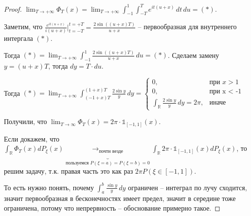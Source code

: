 \begin{proof}






    $\lim_{T \to +\infty} \Phi_T (x) = \lim_{T \to +\infty} \int_{-1}^1 \int_{-T}^T e^{it(u + x)} \, dt \, du = (*)$.

    Заметим, что $\frac{e^{it(u + x)}}{i(u + x)} \bigg |_{t = -T}^{t = +T} = \frac{2\sin ((u + x)T)}{u + x}$ -- первообразная для внутреннего интергала $(*)$.

    Тогда $(*) = \lim_{T \to +\infty} \int_{-1}^1 \frac{2\sin ((u + x)T)}{u + x} \, du = (*)$. Сделаем замену $y = (u + x)T$, тогда $dy = T \cdot du$.

    Тогда $(*) = \lim_{T \to +\infty} \int_{(-1 + x)T}^{(1 + x)T} \frac{2 \sin y}{y} \, dy = \begin{cases}
        0, & \text{при $x > 1$} \\
        0, & \text{при x < -1} \\
        \int_{\mathbb{R}} \frac{2 \sin y}{y} \, dy = 2\pi, & \text{иначе}
    \end{cases}$

    Получили, что $\lim_{T \to \infty} \Phi_T(x) = 2 \pi \cdot \mathds{1}_{[-1, 1]} (x)$.

    Если докажем, что $\int_{\mathbb{R}} \Phi_{T} (x) d P_{\xi}(x) \underbrace{\to_{\text{почти везде}}}_{\text{пользуемся } P(\xi = a) = P(\xi = b) = 0 } \int_{\mathbb{R}} 2 \pi \cdot \mathds{1}_{[-1, 1]} (x) d P_{\xi}(x)$, то решим задачу, т.к. правая часть это как раз $2 \pi P(\xi \in [-1, 1])$.

    То есть нужно понять, почему $\int_{a}^b \frac{\sin y}{y} \, dy$ ограничен -- интеграл по лучу сходится, значит первообразная в бесконечностях имеет предел, значит в середине тоже ограничена, потому что непрервность -- обоснование примерно такое.

\end{proof}

